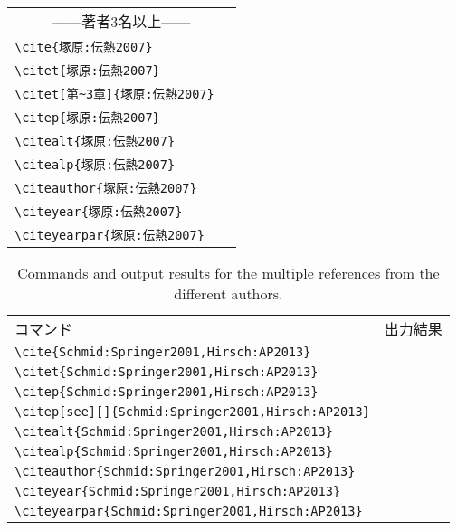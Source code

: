\documentclass[a4paper,fleqn,uplatex,dvipdfmx]{jsarticle}
\begin{document}
\begin{table}[t]
\begin{tabular}{ll}
        \multicolumn{2}{c}{------著者3名以上------} \\
        \verb|\cite{塚原:伝熱2007}|             &\cite{塚原:伝熱2007} \\
        \verb|\citet{塚原:伝熱2007}|            &\citet{塚原:伝熱2007} \\
        \verb|\citet[第~3章]{塚原:伝熱2007}|            &\citet[第~3章]{塚原:伝熱2007} \\
        \verb|\citep{塚原:伝熱2007}|            &\citep{塚原:伝熱2007} \\
        \verb|\citealt{塚原:伝熱2007}|          &\citealt{塚原:伝熱2007} \\
        \verb|\citealp{塚原:伝熱2007}|          &\citealp{塚原:伝熱2007} \\
        \verb|\citeauthor{塚原:伝熱2007}|       &\citeauthor{塚原:伝熱2007} \\
        \verb|\citeyear{塚原:伝熱2007}|         &\citeyear{塚原:伝熱2007} \\
        \verb|\citeyearpar{塚原:伝熱2007}|      &\citeyearpar{塚原:伝熱2007}
    \end{tabular}
\end{table}

\clearpage
\begin{table}[t]
    \centering
    \caption{Commands and output results for the multiple references from the different authors.}
    \label{tab:different_authors}
    \begin{tabular}{ll}
        コマンド &出力結果 \\
        \verb|\cite{Schmid:Springer2001,Hirsch:AP2013}|            &\cite{Schmid:Springer2001,Hirsch:AP2013} \\
        \verb|\citet{Schmid:Springer2001,Hirsch:AP2013}|           &\citet{Schmid:Springer2001,Hirsch:AP2013} \\
        \verb|\citep{Schmid:Springer2001,Hirsch:AP2013}|           &\citep{Schmid:Springer2001,Hirsch:AP2013} \\
        \verb|\citep[see][]{Schmid:Springer2001,Hirsch:AP2013}|           &\citep[see][]{Schmid:Springer2001,Hirsch:AP2013} \\
        \verb|\citealt{Schmid:Springer2001,Hirsch:AP2013}|         &\citealt{Schmid:Springer2001,Hirsch:AP2013} \\
        \verb|\citealp{Schmid:Springer2001,Hirsch:AP2013}|         &\citealp{Schmid:Springer2001,Hirsch:AP2013} \\
        \verb|\citeauthor{Schmid:Springer2001,Hirsch:AP2013}|      &\citeauthor{Schmid:Springer2001,Hirsch:AP2013} \\
        \verb|\citeyear{Schmid:Springer2001,Hirsch:AP2013}|        &\citeyear{Schmid:Springer2001,Hirsch:AP2013} \\
        \verb|\citeyearpar{Schmid:Springer2001,Hirsch:AP2013}|     &\citeyearpar{Schmid:Springer2001,Hirsch:AP2013}
    \end{tabular}
\end{table}
\end{document}
